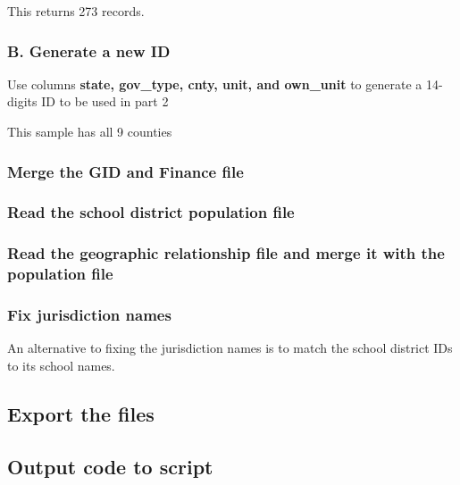 \documentclass[]{article}
\newenvironment{Shaded}{\begin{snugshade}}{\end{snugshade}}
\newcommand{\CommentTok}[1]{\textcolor[rgb]{0.56,0.35,0.01}{\textit{#1}}}
\begin{document}
This returns 273 records.

\subsubsection{B. Generate a new ID}\label{b.-generate-a-new-id}

Use columns \textbf{state, gov\_type, cnty, unit, and own\_unit} to
generate a 14-digits ID to be used in part 2

\begin{Shaded}
\end{Shaded}

This sample has all 9 counties

\subsubsection{Merge the GID and Finance
file}\label{merge-the-gid-and-finance-file}

\begin{Shaded}
\end{Shaded}

\subsubsection{Read the school district population
file}\label{read-the-school-district-population-file}

\subsubsection{Read the geographic relationship file and merge it with
the population
file}\label{read-the-geographic-relationship-file-and-merge-it-with-the-population-file}

\subsubsection{Fix jurisdiction names}\label{fix-jurisdiction-names}

An alternative to fixing the jurisdiction names is to match the school
district IDs to its school names.

\subsection{Export the files}\label{export-the-files}

\subsection{Output code to script}\label{output-code-to-script}
\end{document}
